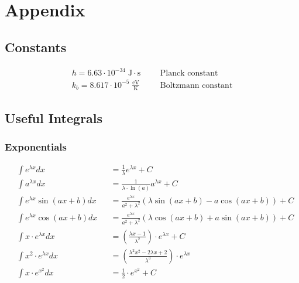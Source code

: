 \section{Appendix}
\subsection{Constants}
\noindent\begin{align*}
    h = 6.63 \cdot 10^{-34} \;\mathrm{J\cdot s}&&& \text{Planck constant}\\
    k_b =8.617 \cdot 10^{-5} \;\mathrm{\frac{eV}{K}}&&&\text{Boltzmann constant}     
\end{align*}

\subsection{Useful Integrals}
\subsubsection{Exponentials}
\begin{footnotesize}
    \noindent\begin{align*}
         & \int e^{\lambda x}dx           &  & =\frac{1}{\lambda }e^{\lambda x}+C                                          \\
         & \int a^{\lambda x}dx           &  & =\frac{1}{\lambda \cdot \ln(a)}a^{\lambda x}+C                              \\
         & \int e^{\lambda x}\sin(ax+b)dx &  & =\frac{e^{\lambda x}}{a^2+\lambda ^2}\left(\lambda \sin(ax+b)-a\cos(ax+b)\right)+C \\
         & \int e^{\lambda x}\cos(ax+b)dx &  & =\frac{e^{\lambda x}}{a^2+\lambda ^2}\left(\lambda \cos(ax+b)+a\sin(ax+b)\right)+C \\
         & \int x \cdot e^{\lambda x}dx   &  & =(\frac{\lambda x-1}{\lambda ^2})\cdot e^{\lambda x}+C                             \\
         & \int x^2 \cdot e^{\lambda x}dx &  & =(\frac{\lambda ^2x^2-2\lambda x+2}{\lambda ^3})\cdot e^{\lambda x}                       \\
         & \int x\cdot e^{x^2}dx   &  & =\frac{1}{2}\cdot e^{x^2}+C
    \end{align*}
\end{footnotesize}

